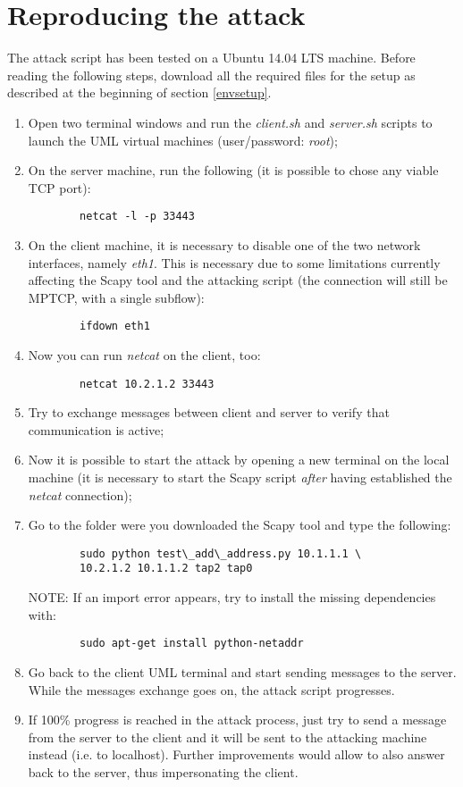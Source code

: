 \section{Reproducing the attack}
\label{reprattack}
The attack script has been tested on a Ubuntu 14.04 LTS machine. Before reading the following steps, download all the required files for the setup as described at the beginning of section \ref{envsetup}.

\begin{enumerate}
\item
    Open two terminal windows and run the \textit{client.sh} and \textit{server.sh} scripts to launch the UML virtual machines (user/password: \textit{root});
\item
    On the server machine, run the following (it is possible to chose any viable TCP port):
\begin{verbatim}
        netcat -l -p 33443
\end{verbatim}
\item
    On the client machine, it is necessary to disable one of the two network interfaces, namely \textit{eth1}. This is necessary due to some limitations currently affecting the Scapy tool and the attacking script (the connection will still be MPTCP, with a single subflow):
\begin{verbatim}
        ifdown eth1
\end{verbatim}
\item
    Now you can run \textit{netcat} on the client, too:
\begin{verbatim}
        netcat 10.2.1.2 33443
\end{verbatim}
\item
    Try to exchange messages between client and server to verify that communication is active;
\item
    Now it is possible to start the attack by opening a new terminal on the local machine (it is necessary to start the Scapy script \textit{after} having established the \textit{netcat} connection);
\item
    Go to the folder were you downloaded the Scapy tool and type the following:
\begin{verbatim}
        sudo python test\_add\_address.py 10.1.1.1 \
        10.2.1.2 10.1.1.2 tap2 tap0
\end{verbatim}
    NOTE: If an import error appears, try to install the missing dependencies with:
\begin{verbatim}
        sudo apt-get install python-netaddr
\end{verbatim}
\item
    Go back to the client UML terminal and start sending messages to the server. While the messages exchange goes on, the attack script progresses.
\item
    If 100\% progress is reached in the attack process, just try to send a message from the server to the client and it will be sent to the attacking machine instead (i.e. to localhost). Further improvements would allow to also answer back to the server, thus impersonating the client.
\end{enumerate}

